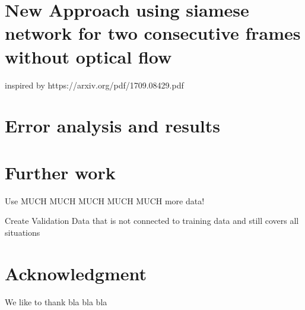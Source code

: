 \documentclass[conference]{IEEEtran}
\begin{document}
\section{New Approach using siamese network for two consecutive frames without optical flow}
inspired by https://arxiv.org/pdf/1709.08429.pdf

\section{Error analysis and results}

\section{Further work}

Use MUCH MUCH MUCH MUCH MUCH more data!

Create Validation Data that is not connected to training data and still covers all situations


\section*{Acknowledgment}
We like to thank bla bla bla




\printbibliography
\end{document}
